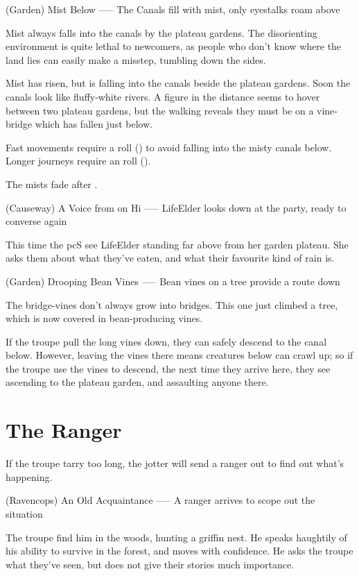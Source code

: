 (Garden) Mist Below
-----
{The Canals fill with mist, only eyestalks roam above}

Mist always falls into the canals by the plateau gardens.
The disorienting environment is quite lethal to newcomers, as people who don't know where the land lies can easily make a misstep, tumbling down the sides.

\begin{boxtext}
  Mist has risen, but is falling into the canals beside the plateau gardens.
  Soon the canals look like fluffy-white rivers.
  A figure in the distance seems to hover between two plateau gardens, but the walking reveals they must be on a vine-bridge which has fallen just below.
\end{boxtext}

Fast movements require a  roll (\tn[8]) to avoid falling into the misty canals below.
Longer journeys require an  roll (\tn[10]).

The mists fade after .

(Causeway) A Voice from on Hi
-----
{LifeElder looks down at the party, ready to converse again}

This time the \gls{pc}S see LifeElder standing far above from her garden plateau.
She asks them about what they've eaten, and what their favourite kind of rain is.

(Garden) Drooping Bean Vines
-----
{Bean vines on a tree provide a route down}

The bridge-vines don't always grow into bridges.
This one just climbed a tree, which is now covered in bean-producing vines.

If the troupe pull the long vines down, they can safely descend to the canal below.
However, leaving the vines there means creatures below can crawl up; so if the troupe use the vines to descend, the next time they arrive here, they see  ascending to the plateau garden, and assaulting anyone there.

\section{The Ranger}

If the troupe tarry too long, the \gls{jotter} will send a ranger out to find out what's happening.

(Ravencops) An Old Acquaintance
-----
{A ranger arrives to scope out the situation}

The troupe find him in the woods, hunting a griffin nest.
He speaks haughtily of his ability to survive in the forest, and moves with confidence.
He asks the troupe what they've seen, but does not give their stories much importance.


